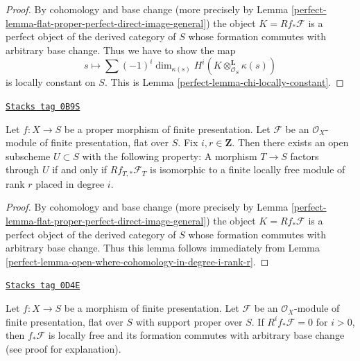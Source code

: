 \begin{proof}

By cohomology and base change (more precisely by
Lemma \ref{perfect-lemma-flat-proper-perfect-direct-image-general})
the object $K = Rf_*\mathcal{F}$ is a perfect object of the derived
category of $S$ whose formation commutes with arbitrary base change.
Thus we have to show the map
$$
s \longmapsto \sum (-1)^i \dim_{\kappa(s)}
H^i(K \otimes^\mathbf{L}_{\mathcal{O}_S} \kappa(s))
$$
is locally constant on $S$. This is Lemma \ref{perfect-lemma-chi-locally-constant}.
\end{proof}

\begin{lemma}
\label{perfect-lemma-open-where-cohomology-in-degree-i-rank-r-geometric}
\href{https://stacks.math.columbia.edu/tag/0B9S}{\texttt{Stacks tag 0B9S}}

Let $f : X \to S$ be a proper morphism of finite presentation.
Let $\mathcal{F}$ be an $\mathcal{O}_X$-module of finite presentation,
flat over $S$. Fix $i, r \in \mathbf{Z}$.
Then there exists an open subscheme
$U \subset S$ with the following property:
A morphism $T \to S$ factors through $U$ if and only if
$Rf_{T, *}\mathcal{F}_T$ is isomorphic to a
finite locally free module of rank $r$ placed in degree $i$.
\end{lemma}

\begin{proof}

By cohomology and base change (more precisely by
Lemma \ref{perfect-lemma-flat-proper-perfect-direct-image-general})
the object $K = Rf_*\mathcal{F}$ is a perfect object of the derived
category of $S$ whose formation commutes with arbitrary base change.
Thus this lemma follows immediately from
Lemma \ref{perfect-lemma-open-where-cohomology-in-degree-i-rank-r}.
\end{proof}

\begin{lemma}
\label{perfect-lemma-vanishing-implies-locally-free}
\href{https://stacks.math.columbia.edu/tag/0D4E}{\texttt{Stacks tag 0D4E}}

Let $f : X \to S$ be a morphism of finite presentation.
Let $\mathcal{F}$ be an $\mathcal{O}_X$-module of finite presentation,
flat over $S$ with support proper over $S$. If $R^if_*\mathcal{F} = 0$
for $i > 0$, then $f_*\mathcal{F}$ is locally free and its formation
commutes with arbitrary base change (see proof for explanation).
\end{lemma}

